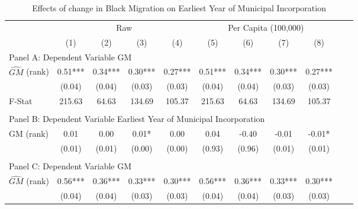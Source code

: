  \begin{table}[htbp]\centering {} \begin{threeparttable} \caption{Effects of change in Black Migration on Earliest Year of Municipal Incorporation} \begin{tabular}{l*{10}{c}} \toprule
                &\multicolumn{4}{c}{Raw}                                    &\multicolumn{4}{c}{Per Capita (100,000)}                   \\\cmidrule(lr){2-5}\cmidrule(lr){6-9}
                &\multicolumn{1}{c}{(1)}   &\multicolumn{1}{c}{(2)}   &\multicolumn{1}{c}{(3)}   &\multicolumn{1}{c}{(4)}   &\multicolumn{1}{c}{(5)}   &\multicolumn{1}{c}{(6)}   &\multicolumn{1}{c}{(7)}   &\multicolumn{1}{c}{(8)}   \\
\cmidrule(lr){1-9}
\multicolumn{8}{l}{Panel A: Dependent Variable GM}\\
\cmidrule(lr){1-9}
$\hat{GM}$ (rank)&       0.51***&       0.34***&       0.30***&       0.27***&       0.51***&       0.34***&       0.30***&       0.27***\\
                &     (0.04)   &     (0.04)   &     (0.03)   &     (0.03)   &     (0.04)   &     (0.04)   &     (0.03)   &     (0.03)   \\
\midrule
F-Stat          &     215.63   &      64.63   &     134.69   &     105.37   &     215.63   &      64.63   &     134.69   &     105.37   \\
\cmidrule[\heavyrulewidth](lr){1-9} \\ \cmidrule[\heavyrulewidth](lr){1-9}
\multicolumn{8}{l}{Panel B: Dependent Variable Earliest Year of Municipal Incorporation}\\
\cmidrule(lr){1-9}
GM  (rank)      &       0.01   &       0.00   &       0.01*  &       0.00   &       0.04   &      -0.40   &      -0.01   &      -0.01*  \\
                &     (0.01)   &     (0.01)   &     (0.00)   &     (0.00)   &     (0.93)   &     (0.96)   &     (0.01)   &     (0.01)   \\
\cmidrule[\heavyrulewidth](lr){1-9} \\ \cmidrule[\heavyrulewidth](lr){1-9}
\multicolumn{8}{l}{Panel C: Dependent Variable GM}\\
\cmidrule(lr){1-9}
$\hat{GM}$ (rank)&       0.56***&       0.36***&       0.33***&       0.30***&       0.56***&       0.36***&       0.33***&       0.30***\\
                &     (0.04)   &     (0.04)   &     (0.03)   &     (0.03)   &     (0.04)   &     (0.04)   &     (0.03)   &     (0.03)   \\

\end{tabular}
\end{threeparttable}
\end{table}

